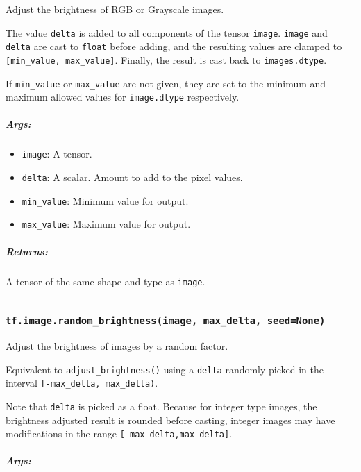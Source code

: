Adjust the brightness of RGB or Grayscale images.

The value \texttt{delta} is added to all components of the tensor
\texttt{image}. \texttt{image} and \texttt{delta} are cast to
\texttt{float} before adding, and the resulting values are clamped to
\texttt{{[}min\_value,\ max\_value{]}}. Finally, the result is cast back
to \texttt{images.dtype}.

If \texttt{min\_value} or \texttt{max\_value} are not given, they are
set to the minimum and maximum allowed values for \texttt{image.dtype}
respectively.

\subparagraph{Args: }\label{args-19}

\begin{itemize}
\tightlist
\item
  \texttt{image}: A tensor.
\item
  \texttt{delta}: A scalar. Amount to add to the pixel values.
\item
  \texttt{min\_value}: Minimum value for output.
\item
  \texttt{max\_value}: Maximum value for output.
\end{itemize}

\subparagraph{Returns: }\label{returns-19}

A tensor of the same shape and type as \texttt{image}.

\begin{center}\rule{0.5\linewidth}{\linethickness}\end{center}

\subsubsection{\texorpdfstring{\texttt{tf.image.random\_brightness(image,\ max\_delta,\ seed=None)}
}{tf.image.random\_brightness(image, max\_delta, seed=None) }}\label{tf.image.randomux5fbrightnessimage-maxux5fdelta-seednone}

Adjust the brightness of images by a random factor.

Equivalent to \texttt{adjust\_brightness()} using a \texttt{delta}
randomly picked in the interval \texttt{{[}-max\_delta,\ max\_delta)}.

Note that \texttt{delta} is picked as a float. Because for integer type
images, the brightness adjusted result is rounded before casting,
integer images may have modifications in the range
\texttt{{[}-max\_delta,max\_delta{]}}.

\subparagraph{Args: }\label{args-20}

